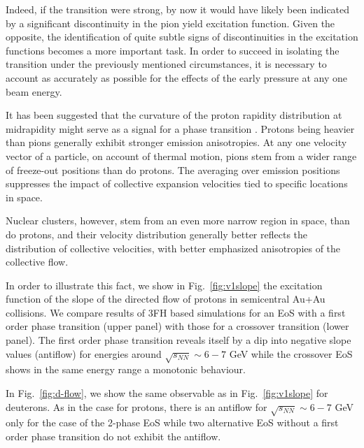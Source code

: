 \documentclass[epj]{svjour}
\begin{document}
Indeed, if the transition were strong, by now it would have likely been 
indicated by a significant discontinuity in the pion yield excitation function.
Given the opposite, the identification of quite subtle signs of discontinuities
in the excitation functions becomes a more important task.
In order to succeed in isolating the transition under the previously mentioned 
circumstances, it is  necessary to account as accurately as
possible for the effects of the early pressure at any one beam energy.

It has been suggested that the curvature of the proton rapidity
distribution at midrapidity might serve as a signal for a phase transition
\cite{Ivanov:2010cu}.
Protons being heavier than pions generally exhibit stronger emission
anisotropies.  
At any one velocity vector of a particle, on account of thermal motion, pions
stem from a wider range of freeze-out positions than do protons.
The averaging over emission positions suppresses the impact of collective
expansion velocities tied to specific locations in space.

Nuclear clusters, however, stem from an even more narrow region in space, than
do protons, and their velocity distribution generally better reflects the
distribution of collective velocities, with better emphasized anisotropies of
the collective flow.

In order to illustrate this fact, we show in Fig.~\ref{fig:v1slope} the excitation function 
of the slope of the directed flow of protons in semicentral Au+Au collisions.
We compare results of 3FH based simulations \cite{THESEUS} 
for an EoS with a first order phase transition (upper panel) with those for a crossover 
transition (lower panel). 
The first order phase transition reveals itself by a dip into negative slope values (antiflow)
for energies around $\sqrt{s_{NN}}\sim 6-7$ GeV while the crossover EoS shows in the same 
energy range a monotonic behaviour.

In Fig.~\ref{fig:d-flow}, we show the same observable as in  Fig.~\ref{fig:v1slope} for deuterons.
As in the case for protons, there is an antiflow for $\sqrt{s_{NN}}\sim 6-7$ GeV only for the case of the 
2-phase EoS while two alternative EoS without a first order phase transition do not exhibit the antiflow. 
\end{document}
